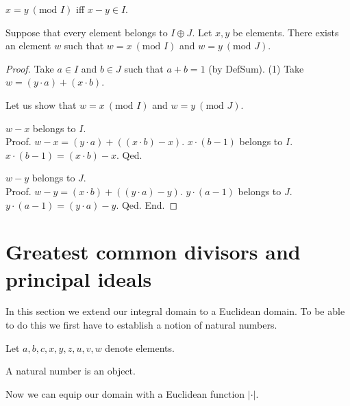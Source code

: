 \documentclass{article}
\renewcommand{\mod}{\text{mod }}
\begin{document}
  \begin{forthel}
    \begin{definition}[id=DefMod]
      $x = y ~(\mod I)$ iff $x - y \in I$.
    \end{definition}

    \begin{theorem}[id=ChineseRemainder]
      Suppose that every element belongs to $I \oplus J$.
      Let $x, y$ be elements.
      There exists an element $w$ such that $w = x ~(\mod I)$ and
      $w = y ~(\mod J)$.
    \end{theorem}
    \begin{proof}
      Take $a \in I$ and $b \in J$ such that $a + b = 1$ (by DefSum).
      (1) Take $w = (y \cdot a) + (x \cdot b)$.

      Let us show that $w = x ~(\mod I)$ and $w = y ~(\mod J)$.

        $w - x$ belongs to $I$. \\
        Proof.
          $w - x = (y \cdot a) + ((x \cdot b) - x)$.
          $x \cdot (b - 1)$ belongs to $I$.
          $x \cdot (b - 1) = (x \cdot b) - x$.
        Qed.

        $w - y$ belongs to $J$. \\
        Proof.
          $w - y = (x \cdot b) + ((y \cdot a) - y)$.
          $y \cdot (a - 1)$ belongs to $J$.
          $y \cdot (a - 1) = (y \cdot a) - y$.
        Qed.
      End.
    \end{proof}
  \end{forthel}


  \section{Greatest common divisors and principal ideals}

  In this section we extend our integral domain to a Euclidean domain. To be
  able to do this we first have to establish a notion of natural numbers.

  \begin{forthel}
    Let $a,b,c,x,y,z,u,v,w$ denote elements.

    \begin{signature}[id=NatSort]
      A natural number is an object.
    \end{signature}

  \end{forthel}

  Now we can equip our domain with a Euclidean function $|\cdot|$.
\end{document}

